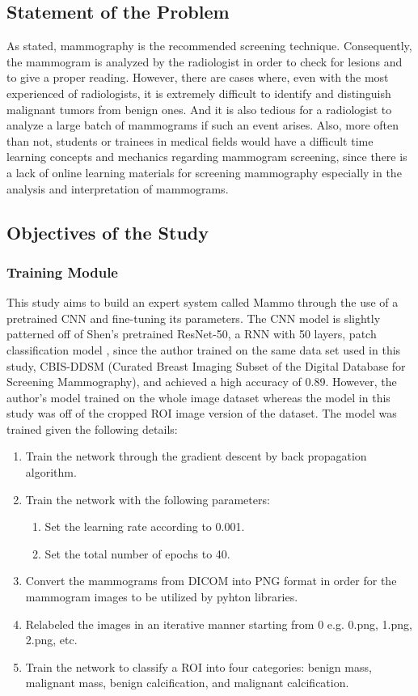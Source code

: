 \subsection{Statement of the Problem}
	As stated, mammography is the recommended screening technique. Consequently, the mammogram is analyzed by the radiologist in order to check for lesions and to give a proper reading. However, there are cases where, even with the most experienced of radiologists, it is extremely difficult to identify and distinguish malignant tumors from benign ones. And it is also tedious for a radiologist to analyze a large batch of mammograms if such an event arises.
	Also, more often than not, students or trainees in medical fields would have a difficult time learning concepts and mechanics regarding mammogram screening, since there is a lack of online learning materials for screening mammography especially in the analysis and interpretation of mammograms.

\subsection{Objectives of the Study}
\subsubsection{Training Module}
\qquad This study aims to build an expert system called Mammo through the use of a pretrained CNN and fine-tuning its parameters. The CNN model is slightly patterned off of Shen's pretrained ResNet-50, a RNN with 50 layers, patch classification model \cite{CNNmodel}, since the author trained on the same data set used in this study, CBIS-DDSM (Curated Breast Imaging Subset of the Digital Database for Screening Mammography), and achieved a high accuracy of 0.89. However, the author's model trained on the whole image dataset whereas the model in this study was off of the cropped ROI image version of the dataset. The model was trained given the following details:
	
\begin{enumerate}
	\item Train the network through the gradient descent by back propagation algorithm.
	\item Train the network with the following parameters:
	\begin{enumerate}
		\item Set the learning rate according to 0.001.
		\item Set the total number of epochs to 40.
	\end{enumerate}
	\item Convert the mammograms from DICOM into PNG format in order for the mammogram images to be utilized by pyhton libraries.
	\item Relabeled the images in an iterative manner starting from 0 e.g. 0.png, 1.png, 2.png, etc.
	\item Train the network to classify a ROI into four categories: benign mass, malignant mass, benign calcification, and malignant calcification.
\end{enumerate}

